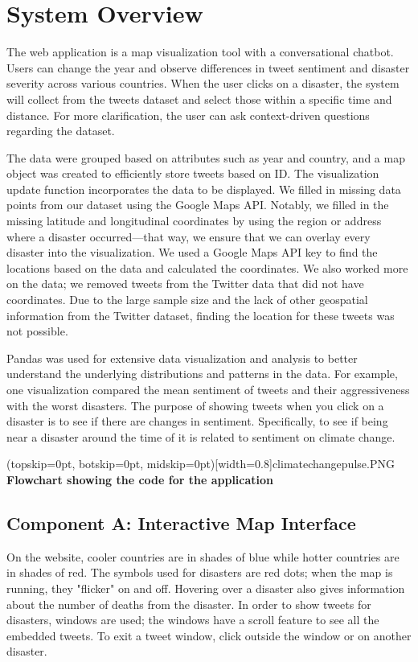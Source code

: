 \documentclass{ieeeaccess}
\begin{document}
\section{System Overview}
\label{sec:system_overview}

The web application is a map visualization tool with a conversational chatbot. Users can change the year and observe differences in tweet sentiment and disaster severity across various countries. When the user clicks on a disaster, the system will collect from the tweets dataset and select those within a specific time and distance. For more clarification, the user can ask context-driven questions regarding the dataset.

The data were grouped based on attributes such as year and country, and a map object was created to efficiently store tweets based on ID. The visualization update function incorporates the data to be displayed. We filled in missing data points from our dataset using the Google Maps API. Notably, we filled in the missing latitude and longitudinal coordinates by using the region or address where a disaster occurred—that way, we ensure that we can overlay every disaster into the visualization. We used a Google Maps API key to find the locations based on the data and calculated the coordinates. We also worked more on the data; we removed tweets from the Twitter data that did not have coordinates. Due to the large sample size and the lack of other geospatial information from the Twitter dataset, finding the location for these tweets was not possible.

Pandas was used for extensive data visualization and analysis to better understand the underlying distributions and patterns in the data. For example, one visualization compared the mean sentiment of tweets and their aggressiveness with the worst disasters. The purpose of showing tweets when you click on a disaster is to see if there are changes in sentiment. Specifically, to see if being near a disaster around the time of it is related to sentiment on climate change.

\Figure[t!](topskip=0pt, botskip=0pt, midskip=0pt)[width=0.8\columnwidth]{climatechangepulse.PNG}
{ \textbf{Flowchart showing the code for the application}\label{fig1}}

\subsection{Component A: Interactive Map Interface}
On the website, cooler countries are in shades of blue while hotter countries are in shades of red. The symbols used for disasters are red dots; when the map is running, they "flicker" on and off. Hovering over a disaster also gives information about the number of deaths from the disaster. In order to show tweets for disasters, windows are used; the windows have a scroll feature to see all the embedded tweets. To exit a tweet window, click outside the window or on another disaster.
\end{document}
